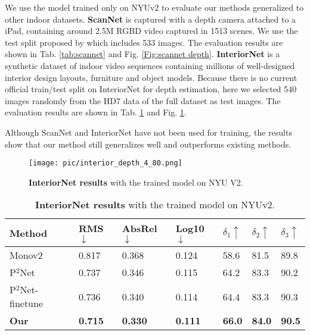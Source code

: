\documentclass[10pt,twocolumn,letterpaper]{article}
\newcommand{\Fig}[1]{Fig. \ref{#1}}
\newcommand{\Tab}[1]{Tab. \ref{#1}}
\begin{document}
We use the model trained only on NYUv2 to evaluate our methods generalized to other indoor datasets.
\textbf{ScanNet}\cite{dai2017scannet} is captured with a depth camera attached to a iPad, containing around 2.5M RGBD video captured in 1513 scenes. We use the test split proposed by \cite{yu2020p} which includes 533 images. The evaluation results are shown in \Tab{tab:scannet} and \Fig{Fig:scannet depth}.
\textbf{InteriorNet}\cite{li2018interiornet} is a synthetic dataset of indoor video sequences containing millions of well-designed interior design layouts, furniture and object models. Because there is no current official train/test split on InteriorNet for depth estimation, here we selected 540 images randomly from the HD7 data of the full dataset as test images. The evaluation results are shown in \Tab{tab:interiornet} and \Fig{Fig:interior depth}.

Although ScanNet and InteriorNet have not been used for training, the results show that our method still generalizes well and outperforms existing methods.

\begin{figure}[ht]                        
	\centering                                          
	\texttt{[image: pic/interior\_depth\_4\_80.png]} \caption{\textbf{InteriorNet results} with the trained model on NYU V2.}	\label{Fig:interior depth}
\end{figure}

\begin{table}[h]
	\scriptsize
	\centering
	\begin{tabularx}{0.48\textwidth}{|l|XXX|XXX|}
		\hline
		Method & RMS$\downarrow$ & AbsRel$\downarrow$ & Log10$\downarrow$ & $\delta_{1}\uparrow$ & $\delta_{2}\uparrow$ & $\delta_{3}\uparrow$ \\
		\hline
		Monov2\cite{godard2019digging} & 0.817 & 0.368  & 0.124 & 58.6  & 81.5  & 89.8 \\
		
		P$^2$Net \cite{yu2020p} & 0.737  & 0.346 & 0.115 & 64.2    & 83.3  & 90.2 \\
		
		P$^2$Net-finetune  & 0.736  & 0.340 & 0.114 & 64.4    & 83.3  & 90.3 \\
		
\textbf{Our}   & \textbf{0.715} & \textbf{0.330} & \textbf{0.111} & \textbf{66.0}  & \textbf{84.0}  & \textbf{90.5} \\
		\hline
	\end{tabularx}
	\newline
	\caption{\textbf{InteriorNet results} with the trained model on NYUv2.}
	\label{tab:interiornet}
\end{table}
\end{document}
